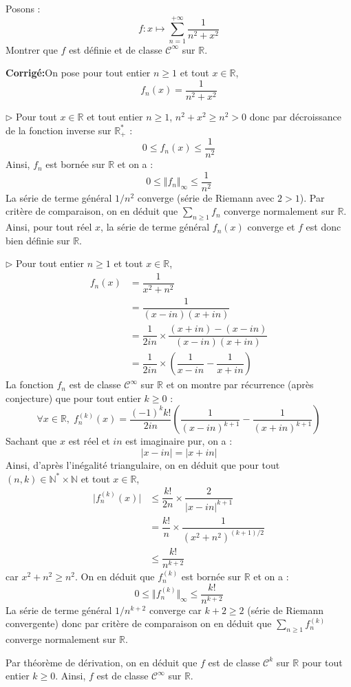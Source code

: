 \documentclass[a4paper,twoside,french,11pt]{VcCours}
\newcommand{\Sum}[2]{\sum_{#1}^{#2}}
\newcommand{\corr}{\textbf{Corrigé:}}
\begin{document}
\medskip



 

\begin{Exercice}{} Posons :
$$f: x \mapsto \sum_{n=1}^{+ \infty} \dfrac{1}{n^2+x^2}$$
Montrer que $f$ est définie et de classe $\mathcal{C}^{\infty}$ sur $\mathbb{R}$.
\end{Exercice} 

\corr On pose pour tout entier $n \geq 1$ et tout $x \in \mathbb{R}$,
$$ f_n(x) = \dfrac{1}{n^2+x^2}$$

\medskip

$\rhd$ Pour tout $x \in \mathbb{R}$ et tout entier $n \geq 1$, $n^2+x^2 \geq n^2>0$ donc par décroissance de la fonction inverse sur $\mathbb{R}_+^*$ :
$$ 0 \leq f_n(x) \leq \dfrac{1}{n^2}$$
Ainsi, $f_n$ est bornée sur $\mathbb{R}$ et on a :
$$ 0 \leq \Vert f_n \Vert_{\infty} \leq \dfrac{1}{n^2}$$
La série de terme général $1/n^2$ converge (série de Riemann avec $2>1$). Par critère de comparaison, on en déduit que $\Sum{n \geq1}{} f_n$ converge normalement sur $\mathbb{R}$. Ainsi, pour tout réel $x$, la série de terme général $f_n(x)$ converge et $f$ est donc bien définie sur $\mathbb{R}$.

\medskip

$\rhd$ Pour tout entier $n \geq 1$ et tout $x \in \mathbb{R}$,
\begin{align*}
f_n(x) & = \dfrac{1}{x^2+n^2} \\
& = \dfrac{1}{(x-in)(x+in)} \\
& = \dfrac{1}{2in} \times \dfrac{(x+in)-(x-in)}{(x-in)(x+in)} \\
& = \dfrac{1}{2in} \times \left( \dfrac{1}{x-in} - \dfrac{1}{x+in} \right)
\end{align*}
La fonction $f_n$ est de classe $\mathcal{C}^{\infty}$ sur $\mathbb{R}$ et on montre par récurrence (après conjecture) que pour tout entier $k \geq 0$ :
$$ \forall x \in \mathbb{R}, \; f_n^{(k)}(x) = \dfrac{(-1)^k k!}{2in} \left( \dfrac{1}{(x-in)^{k+1}} - \dfrac{1}{(x+in)^{k+1}} \right) $$
Sachant que $x$ est réel et $in$ est imaginaire pur, on a :
$$ \vert x-in \vert = \vert x+in \vert$$
Ainsi, d'après l'inégalité triangulaire, on en déduit que pour tout $(n,k) \in \mathbb{N}^* \times \mathbb{N}$ et tout $x \in \mathbb{R}$,
\begin{align*}
\vert  f_n^{(k)}(x) \vert & \leq \dfrac{k!}{2n} \times \dfrac{2}{\vert x-in \vert^{k+1}} \\
& = \dfrac{k!}{n} \times \dfrac{1}{(x^2+n^2)^{(k+1)/2}} \\
& \leq \dfrac{k!}{n^{k+2}}  
\end{align*}
car $x^2+n^2 \geq n^2$. On en déduit que $f_n^{(k)}$ est bornée sur $\mathbb{R}$ et on a :
$$ 0 \leq \Vert f_n^{(k)} \Vert_{\infty} \leq \dfrac{k!}{n^{k+2}} $$
La série de terme général $1/n^{k+2}$ converge car $k+2 \geq 2$ (série de Riemann convergente) donc par critère de comparaison on en déduit que $\sum_{n \geq 1} f_n^{(k)}$ converge normalement sur $\mathbb{R}$.

\medskip

Par théorème de dérivation, on en déduit que $f$ est de classe $\mathcal{C}^k$ sur $\mathbb{R}$ pour tout entier $k \geq 0$. Ainsi, $f$ est de classe $\mathcal{C}^{\infty}$ sur $\mathbb{R}$.
\end{document}
